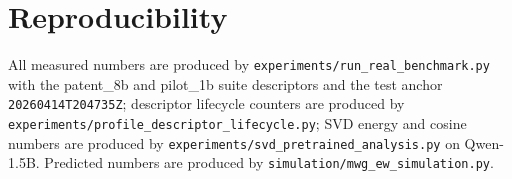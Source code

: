 \documentclass[11pt]{article}
\theoremstyle{definition}
\begin{document}
\appendix
\section{Reproducibility}
All measured numbers are produced by \texttt{experiments/run\_real\_benchmark.py} with the patent\_8b and pilot\_1b suite descriptors and the test anchor \texttt{20260414T204735Z}; descriptor lifecycle counters are produced by \texttt{experiments/profile\_descriptor\_lifecycle.py}; SVD energy and cosine numbers are produced by \texttt{experiments/svd\_pretrained\_analysis.py} on Qwen-1.5B. Predicted numbers are produced by \texttt{simulation/mwg\_ew\_simulation.py}.
\end{document}

